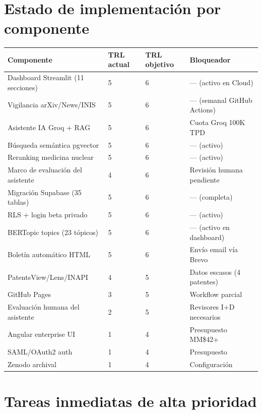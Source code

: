 \documentclass[12pt,a4paper]{report}
\begin{document}
\section{Estado de implementación por componente}

\begin{longtable}{L{5.5cm} C{2cm} C{2cm} L{3.5cm}}
  \toprule
  \textbf{Componente} & \textbf{TRL actual} & \textbf{TRL objetivo} & \textbf{Bloqueador} \\
  \midrule
  \endhead
  Dashboard Streamlit (11 secciones) & 5 & 6 & --- (activo en Cloud) \\
  Vigilancia arXiv/News/INIS & 5 & 6 & --- (semanal GitHub Actions) \\
  Asistente IA Groq + RAG & 5 & 6 & Cuota Groq 100K TPD \\
  Búsqueda semántica pgvector & 5 & 6 & --- (activo) \\
  Reranking medicina nuclear & 5 & 6 & --- (activo) \\
  Marco de evaluación del asistente & 4 & 6 & Revisión humana pendiente \\
  Migración Supabase (35 tablas) & 5 & 6 & --- (completa) \\
  RLS + login beta privado & 5 & 6 & --- (activo) \\
  BERTopic topics (23 tópicos) & 5 & 6 & --- (activo en dashboard) \\
  Boletín automático HTML & 5 & 6 & Envío email vía Brevo \\
  PatentsView/Lens/INAPI & 4 & 5 & Datos escasos (4 patentes) \\
  GitHub Pages & 3 & 5 & Workflow parcial \\
  Evaluación humana del asistente & 2 & 5 & Revisores I+D necesarios \\
  Angular enterprise UI & 1 & 4 & Presupuesto MM\$42+ \\
  SAML/OAuth2 auth & 1 & 4 & Presupuesto \\
  Zenodo archival & 1 & 4 & Configuración \\
  \bottomrule
\end{longtable}

\section{Tareas inmediatas de alta prioridad}
\end{document}
